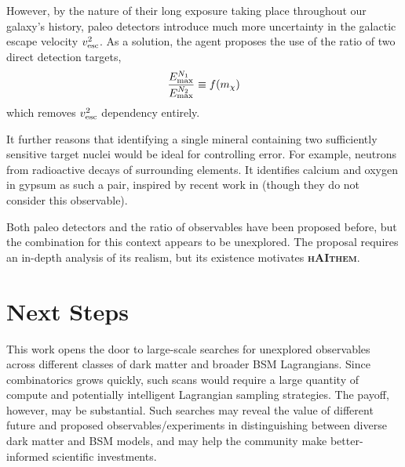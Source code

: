 \documentclass[11pt]{article}
\newcommand{\haithem}{\textbf{\textsc{hAIthem}}}
\newcommand{\datalist}[1]{%
  \begin{tcolorbox}[colback=gray!6,colframe=gray!50,
                    title={Generated: downloads picker}]
  #1
  \end{tcolorbox}}
\begin{document}
However, by the nature of their long exposure taking place throughout our galaxy's history, paleo detectors introduce much more uncertainty in the galactic escape velocity $v^2_{\rm esc}$. As a solution, the agent proposes the use of the ratio of two direct detection targets,
\begin{equation}
    \frac{E_{\rm max}^{N_1}}{E_{\rm max}^{N_2}} \equiv f(m_\chi)
\end{equation}
which removes $v^2_{\rm esc}$ dependency entirely.

It further reasons that identifying a single mineral containing two sufficiently sensitive target nuclei would be ideal for controlling error. For example, neutrons from radioactive decays of surrounding elements. It identifies calcium and oxygen in gypsum as such a pair, inspired by recent work in \cite{Theodosopoulos:2026eym} (though they do not consider this observable).

Both paleo detectors and the ratio of observables have been proposed before, but the combination for this context appears to be unexplored. The proposal requires an in-depth analysis of its realism, but its existence motivates \haithem{}.


\section{Next Steps}

This work opens the door to large-scale searches for unexplored observables across different classes of dark matter and broader BSM Lagrangians. Since combinatorics grows quickly, such scans would require a large quantity of compute and potentially intelligent Lagrangian sampling strategies. The payoff, however, may be substantial. Such searches may reveal the value of different future and proposed observables/experiments in distinguishing between diverse dark matter and BSM models, and may help the community make better-informed scientific investments. 

%
%
%
\end{document}
